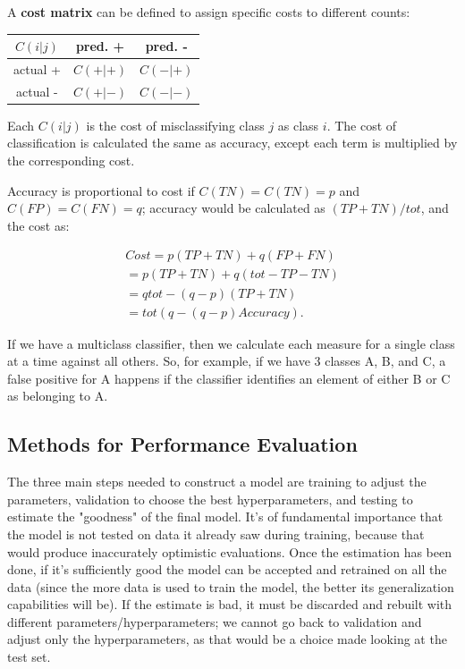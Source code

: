 A \textbf{cost matrix} can be defined to assign specific costs to different counts:
\begin{table}[ht]
    \centering
    \begin{tabular}{|c|c|c|}
         \hline
        $C(i|j)$ & pred. + & pred. - \\
        \hline
        actual + & $C(+|+)$ & $C(-|+)$\\
        \hline
        actual - & $C(+|-)$ & $C(-|-)$\\
        \hline
    \end{tabular}
\end{table}
Each $C(i|j)$ is the cost of misclassifying class $j$ as class $i$. The cost of classification is calculated the same as accuracy, except each term is multiplied by the corresponding cost.

Accuracy is proportional to cost if $C(TN) = C(TN) = p$ and $C(FP) = C(FN) = q$; accuracy would be calculated as $(TP + TN)/tot$, and the cost as:

\begin{align*}
    \textit{Cost} = p(\textit{TP} + \textit{TN}) + q(\textit{FP} + \textit{FN}) \\
    = p(\textit{TP} + \textit{TN}) + q(\textit{tot} - \textit{TP} - \textit{TN}) \\
    = q\textit{tot} - (q - p)(\textit{TP} + \textit{TN}) \\
    = \textit{tot}(q - (q-p)\textit{Accuracy}).
\end{align*}

If we have a multiclass classifier, then we calculate each measure for a single class at a time against all others. So, for example, if we have 3 classes A, B, and C, a false positive for A happens if the classifier identifies an element of either B or C as belonging to A.

\subsection{Methods for Performance Evaluation}

The three main steps needed to construct a model are training to adjust the parameters, validation to choose the best hyperparameters, and testing to estimate the "goodness" of the final model. It's of fundamental importance that the model is not tested on data it already saw during training, because that would produce inaccurately optimistic evaluations. Once the estimation has been done, if it's sufficiently good the model can be accepted and retrained on all the data (since the more data is used to train the model, the better its generalization capabilities will be). If the estimate is bad, it must be discarded and rebuilt with different parameters/hyperparameters; we cannot go back to validation and adjust only the hyperparameters, as that would be a choice made looking at the test set.

